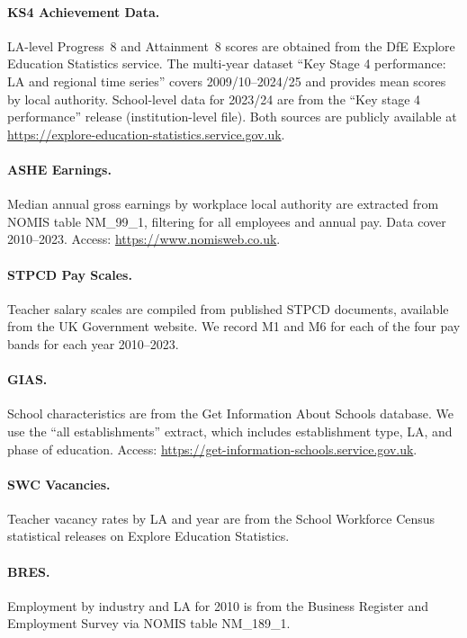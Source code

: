 \documentclass[12pt]{article}
\begin{document}
\paragraph{KS4 Achievement Data.} LA-level Progress~8 and Attainment~8 scores are obtained from the DfE Explore Education Statistics service. The multi-year dataset ``Key Stage 4 performance: LA and regional time series'' covers 2009/10--2024/25 and provides mean scores by local authority. School-level data for 2023/24 are from the ``Key stage 4 performance'' release (institution-level file). Both sources are publicly available at \url{https://explore-education-statistics.service.gov.uk}.

\paragraph{ASHE Earnings.} Median annual gross earnings by workplace local authority are extracted from NOMIS table NM\_99\_1, filtering for all employees and annual pay. Data cover 2010--2023. Access: \url{https://www.nomisweb.co.uk}.

\paragraph{STPCD Pay Scales.} Teacher salary scales are compiled from published STPCD documents, available from the UK Government website. We record M1 and M6 for each of the four pay bands for each year 2010--2023.

\paragraph{GIAS.} School characteristics are from the Get Information About Schools database. We use the ``all establishments'' extract, which includes establishment type, LA, and phase of education. Access: \url{https://get-information-schools.service.gov.uk}.

\paragraph{SWC Vacancies.} Teacher vacancy rates by LA and year are from the School Workforce Census statistical releases on Explore Education Statistics.

\paragraph{BRES.} Employment by industry and LA for 2010 is from the Business Register and Employment Survey via NOMIS table NM\_189\_1.
\end{document}
